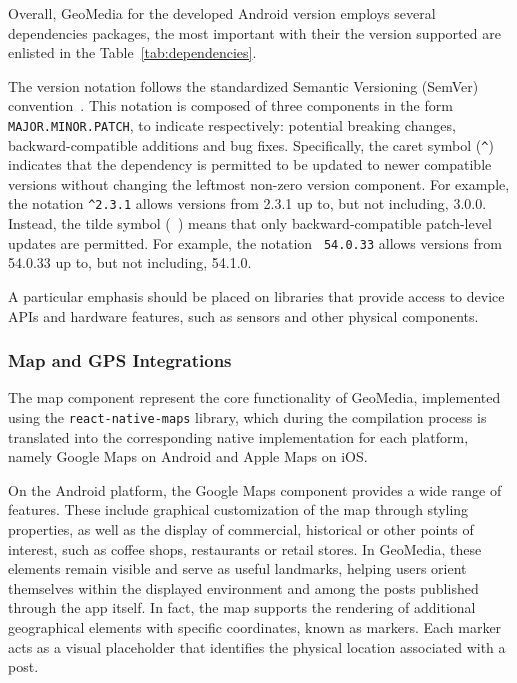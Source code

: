 Overall, GeoMedia for the developed Android version employs several dependencies packages, the most important with their the version supported are enlisted in the Table~\ref{tab:dependencies}.

The version notation follows the standardized Semantic Versioning (SemVer) convention~\cite{site:semver}. This notation is composed of three components in the form \texttt{MAJOR.MINOR.PATCH}, to indicate respectively: potential breaking changes, backward-compatible additions and bug fixes. Specifically, the caret symbol (\texttt{\string^}) indicates that the dependency is permitted to be updated to newer compatible versions without changing the leftmost non-zero version component. For example, the notation \texttt{\string^2.3.1} allows versions from 2.3.1 up to, but not including, 3.0.0. 
Instead, the tilde symbol (\texttt{\string~}) means that only backward-compatible patch-level updates are permitted. For example, the notation \texttt{\string~54.0.33} allows versions from 54.0.33 up to, but not including, 54.1.0. 





A particular emphasis should be placed on libraries that provide access to device APIs and hardware features, such as sensors and other physical components.

\subsubsection{Map and GPS Integrations}
\label{subsub:map_and_gps}

The map component represent the core functionality of GeoMedia, implemented using the \texttt{react-native-maps} library, which during the compilation process is translated into the corresponding native implementation for each platform, namely Google Maps on Android and Apple Maps on iOS.

On the Android platform, the Google Maps component provides a wide range of features. These include graphical customization of the map through styling properties, as well as the display of commercial, historical or other points of interest, such as coffee shops, restaurants or retail stores. In GeoMedia, these elements remain visible and serve as useful landmarks, helping users orient themselves within the displayed environment and among the posts published through the app itself. In fact, the map supports the rendering of additional geographical elements with specific coordinates, known as markers. Each marker acts as a visual placeholder that identifies the physical location associated with a post.


